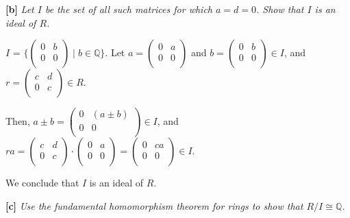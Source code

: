 \vspace{5 mm}
\textbf{[b]} \textit{Let $I$ be the set of all such matrices for which $a = d = 0$. Show that $I$ is an ideal of $R$.}
\vspace{5 mm}

$I$ = $\{ \left(%
\begin{array}{cc}
  0 & b \\
  0 & 0 \\
\end{array}%
\right) \mid b \in \mathbb{Q} \}$. Let $a = \left(%
\begin{array}{cc}
  0 & a \\
  0 & 0 \\
\end{array}%
\right)$ and $b = \left(%
\begin{array}{cc}
  0 & b \\
  0 & 0 \\
\end{array}%
\right) \in I$, and $r = \left(%
\begin{array}{cc}
  c & d \\
  0 & c \\
\end{array}%
\right) \in R$. 

Then, $a \pm b = \left(%
\begin{array}{cc}
  0 & (a \pm b) \\
  0 & 0 \\
\end{array}%
\right) \in I$, and $ra = 
\left(%
\begin{array}{cc}
  c & d \\
  0 & c \\
\end{array}%
\right) \cdot
\left(%
\begin{array}{cc}
  0 & a \\
  0 & 0 \\
\end{array}%
\right) = \left(%
\begin{array}{cc}
  0 & ca \\
  0 & 0 \\
\end{array}%
\right) \in I$.

We conclude that $I$ is an ideal of $R$.

\vspace{5 mm}
\textbf{[c]} \textit{Use the fundamental homomorphism theorem for rings to show that $R/I \cong \mathbb{Q}$.}
\vspace{5 mm}

